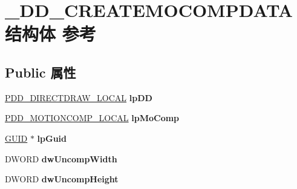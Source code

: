 \hypertarget{struct___d_d___c_r_e_a_t_e_m_o_c_o_m_p_d_a_t_a}{}\section{\+\_\+\+D\+D\+\_\+\+C\+R\+E\+A\+T\+E\+M\+O\+C\+O\+M\+P\+D\+A\+T\+A结构体 参考}
\label{struct___d_d___c_r_e_a_t_e_m_o_c_o_m_p_d_a_t_a}
\subsection*{Public 属性}
\begin{DoxyCompactItemize}
\item 
\mbox{\label{struct___d_d___c_r_e_a_t_e_m_o_c_o_m_p_d_a_t_a_a172ba19aeb2b1823acd3d9e6d4284ba9}} 
\hyperlink{struct___d_d___d_i_r_e_c_t_d_r_a_w___l_o_c_a_l}{P\+D\+D\+\_\+\+D\+I\+R\+E\+C\+T\+D\+R\+A\+W\+\_\+\+L\+O\+C\+AL} {\bfseries lp\+DD}
\item 
\mbox{\label{struct___d_d___c_r_e_a_t_e_m_o_c_o_m_p_d_a_t_a_a256b2b27933cb01c0b355669ffa8700c}} 
\hyperlink{struct_d_d___m_o_t_i_o_n_c_o_m_p___l_o_c_a_l}{P\+D\+D\+\_\+\+M\+O\+T\+I\+O\+N\+C\+O\+M\+P\+\_\+\+L\+O\+C\+AL} {\bfseries lp\+Mo\+Comp}
\item 
\mbox{\label{struct___d_d___c_r_e_a_t_e_m_o_c_o_m_p_d_a_t_a_a051233410a95fd7f1cfbac78298c741e}} 
\hyperlink{interface_g_u_i_d}{G\+U\+ID} $\ast$ {\bfseries lp\+Guid}
\item 
\mbox{\label{struct___d_d___c_r_e_a_t_e_m_o_c_o_m_p_d_a_t_a_aaca4733c3e2f0fdbee6f8d385906f1bd}} 
D\+W\+O\+RD {\bfseries dw\+Uncomp\+Width}
\item 
\mbox{\label{struct___d_d___c_r_e_a_t_e_m_o_c_o_m_p_d_a_t_a_a93894b32e5ddd8edaf3fd9c1987d83ef}} 
D\+W\+O\+RD {\bfseries dw\+Uncomp\+Height}
\item 
\mbox{\label{struct___d_d___c_r_e_a_t_e_m_o_c_o_m_p_d_a_t_a_a9ded1d6d8462b26f05f2c61f09accf08}} 

\end{DoxyCompactItemize}
